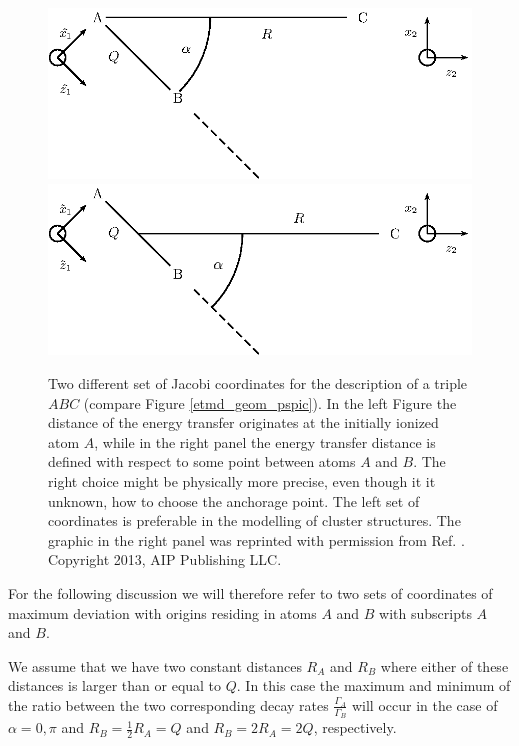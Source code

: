 \begin{figure}
 \centering
 \includegraphics[scale=0.6]{pics/coord_etmd_alt_pspic.eps}
 \hfill
 \includegraphics[scale=0.6]{pics/coord_etmd_pspic.eps}
 \caption{Two different set of Jacobi coordinates for the description of a triple
          $ABC$ (compare Figure \ref{etmd_geom_pspic}).
          In the left Figure the distance of the energy transfer originates
          at the initially ionized atom $A$, while in the right panel the
          energy transfer distance is defined with respect to some
          point between atoms $A$ and $B$. The right choice might be
          physically more precise, even though it it unknown, how to choose
          the anchorage point. The left set of coordinates is preferable
          in the modelling of cluster structures. The graphic in the
          right panel was reprinted with permission
          from Ref. \cite{Fasshauer13}. Copyright 2013, AIP Publishing LLC.}
 \label{figure:coord_etmd_comparison}
\end{figure}

For the following discussion we will therefore refer to two sets
of coordinates of maximum deviation with origins residing in atoms
$A$ and $B$ with subscripts $A$ and $B$.

We assume that we have two constant distances $R_{A}$ and $R_B$
where either of these distances is larger than or equal to $Q$.
In this case the maximum and minimum of the ratio between the two
corresponding decay rates $\frac{\Gamma_{A}}{\Gamma_B}$ will occur
in the case of $\alpha = 0,\pi$ and $R_B = \frac 12 R_{A} = Q$
and $R_B = 2 R_{A} = 2Q$, respectively.


